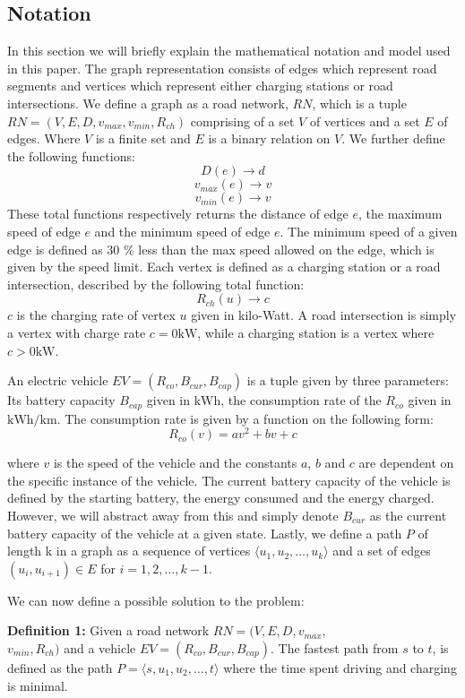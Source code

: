 \subsection{Notation} \label{sec:notation}
In this section we will briefly explain the mathematical notation and model used in this paper. The graph representation consists of edges which represent road segments and vertices which represent either charging stations or road intersections. We define a graph as a road network, $RN$, which is a tuple $RN=(V,E,D,v_{max},v_{min},R_{ch})$ comprising of a set $V$ of vertices and a set $E$ of edges. Where $V$ is a finite set and $E$ is a binary relation on $V$. We further define the following functions:
\[ D(e)\rightarrow d \] 
\[ v_{max}(e)\rightarrow v \]
\[ v_{min}(e)\rightarrow v \]
These total functions respectively returns the distance of edge $e$, the maximum speed of edge $e$ and the minimum speed of edge $e$. The minimum speed of a given edge is defined as 30 \% less than the max speed allowed on the edge, which is given by the speed limit. Each vertex is defined as a charging station or a road intersection, described by the following total function:
\[R_{ch}(u)\rightarrow c\]
$c$ is the charging rate of vertex $u$ given in kilo-Watt. A road intersection is simply a vertex with charge rate $c = 0\si{\kW}$, while a charging station is a vertex where $c > 0\si{\kW}$. 

An electric vehicle $EV=(R_{co},B_{cur},B_{cap})$ is a tuple given by three parameters: Its battery capacity $B_{cap}$ given in $\si{\kWh}$, the consumption rate of the $R_{co}$ given in $\si{\kWh\per\km}$. The consumption rate is given by a function on the following form:
\[ R_{co}(v)=av^2+bv+c \]

where $v$ is the speed of the vehicle and the constants $a$, $b$ and $c$ are dependent on the specific instance of the vehicle. The current battery capacity of the vehicle is defined by the starting battery, the energy consumed and the energy charged. However, we will abstract away from this and simply denote $B_{cur}$ as the current battery capacity of the vehicle at a given state. Lastly, we define a path $P$ of length k in a graph as a sequence of vertices $\langle u_1,u_2,\dots,u_k \rangle$ and a set of edges $(u_{i},u_{i+1})\in E$ for $i=1,2,\dots,k-1$.

We can now define a possible solution to the problem:

\textbf{Definition 1:} Given a road network $RN=(V,E,D,v_{max},$\\ 
$v_{min},R_{ch})$ and a vehicle $EV=(R_{co},B_{cur},B_{cap})$. The fastest path 
from $s$ to $t$, is defined as the path $P = \langle s,u_1,u_2,\dots,t \rangle$ where the time spent driving and charging is minimal.



